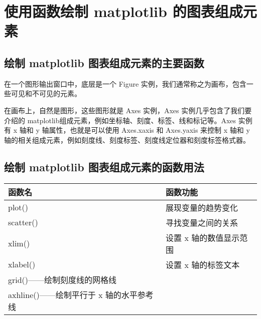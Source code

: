 \chapter{使用函数绘制 matplotlib 的图表组成元素\label{ch01}}
\section{绘制 matplotlib 图表组成元素的主要函数}
在一个图形输出窗口中，底层是一个 Figure 实例，我们通常称之为画布，包含一些可见和不可见的元素。

在画布上，自然是图形，这些图形就是 Axes 实例，Axes 实例几乎包含了我们要介绍的 matplotlib组成元素，例如坐标轴、刻度、标签、线和标记等。Axes 实例有 x 轴和 y 轴属性，也就是可以使用 Axes.xaxis 和 Axes.yaxis 来控制 x 轴和 y 轴的相关组成元素，例如刻度线、刻度标签、刻度线定位器和刻度标签格式器。
\section{绘制 matplotlib 图表组成元素的函数用法}
\begin{table}
    \centering
    \begin{tabular}{ll}
        \hline
        函数名       & 函数功能           \\
        \hline
        plot()    & 展现变量的趋势变化      \\
        scatter() & 寻找变量之间的关系      \\
        xlim()    & 设置 x 轴的数值显示范围  \\
        xlabel()  & 设置 x 轴的标签文本    \\
        grid()——绘制刻度线的网格线          \\
        axhline()——绘制平行于 x 轴的水平参考线 \\
        \hline
    \end{tabular}
\end{table}